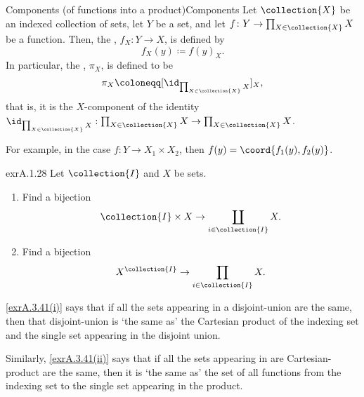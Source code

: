 \begin{dfn}{Components (of functions into a product)}{Components}
Let $\collection{X}$ be an indexed collection of sets, let $Y$ be a set, and let $f\colon Y\rightarrow \prod _{X\in \collection{X}}X$ be a function.  Then, the , $f_X:Y\rightarrow X$, is defined by
\begin{equation}
f_X(y)\coloneqq f(y)_X.
\end{equation}
In particular, the , $\pi _X$, is defined to be
\begin{equation}
\pi _X\coloneqq [\id _{\prod _{X\in \collection{X}}X}]_X,
\end{equation}
that is, it is the $X$-component of the identity $\id _{\prod _{X\in \collection{X}}X}:\prod _{X\in \collection{X}}X\rightarrow \prod _{X\in \collection{X}}X$.
\begin{rmk}
For example, in the case $f\colon Y\rightarrow X_1\times X_2$, then $f(y)=\coord{f_1(y),f_2(y)}$.
\end{rmk}
\end{dfn}
\begin{exr}{}{exrA.1.28}
Let $\collection{I}$ and $X$ be sets.
\begin{enumerate}
\item \label{exrA.3.41(i)}Find a bijection
\begin{equation}
\collection{I}\times X\rightarrow \coprod _{i\in \collection{I}}X.
\end{equation}
\item \label{exrA.3.41(ii)}Find a bijection
\begin{equation}
X^{\collection{I}}\rightarrow \prod _{i\in \collection{I}}X.
\end{equation}
\end{enumerate}
\begin{rmk}
\cref{exrA.3.41(i)} says that if all the sets appearing in a disjoint-union are the same, then that disjoint-union is `the same as' the Cartesian product of the indexing set and the single set appearing in the disjoint union.
		
Similarly, \cref{exrA.3.41(ii)} says that if all the sets appearing in are Cartesian-product are the same, then it is `the same as' the set of all functions from the indexing set to the single set appearing in the product.
\end{rmk}
\end{exr}

